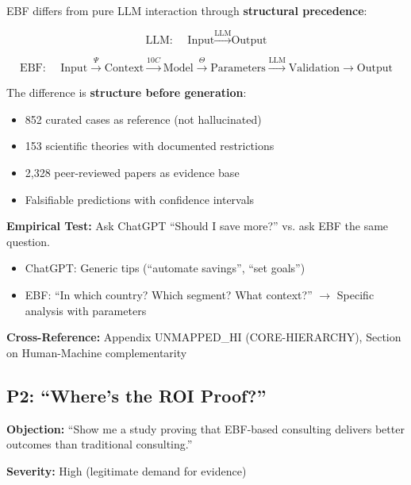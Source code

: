 \begin{axiom}
EBF differs from pure LLM interaction through \textbf{structural precedence}:

\begin{equation}
\text{LLM: } \quad \text{Input} \xrightarrow{\text{LLM}} \text{Output}
\end{equation}

\begin{equation}
\text{EBF: } \quad \text{Input} \xrightarrow{\Psi} \text{Context} \xrightarrow{10C} \text{Model} \xrightarrow{\Theta} \text{Parameters} \xrightarrow{\text{LLM}} \text{Validation} \rightarrow \text{Output}
\end{equation}

The difference is \textbf{structure before generation}:
\begin{itemize}[nosep]
    \item 852 curated cases as reference (not hallucinated)
    \item 153 scientific theories with documented restrictions
    \item 2,328 peer-reviewed papers as evidence base
    \item Falsifiable predictions with confidence intervals
\end{itemize}
\end{axiom}

\textbf{Empirical Test:} Ask ChatGPT ``Should I save more?'' vs. ask EBF the same question.
\begin{itemize}[nosep]
    \item ChatGPT: Generic tips (``automate savings'', ``set goals'')
    \item EBF: ``In which country? Which segment? What context?'' $\rightarrow$ Specific analysis with parameters
\end{itemize}

\textbf{Cross-Reference:} Appendix UNMAPPED_HI (CORE-HIERARCHY), Section on Human-Machine complementarity

\subsection{P2: ``Where's the ROI Proof?''}
\label{sec:da-p2}

\begin{tcolorbox}[colback=gray!5!white, colframe=gray!75!black]
\textbf{Objection:} ``Show me a study proving that EBF-based consulting
delivers better outcomes than traditional consulting.''

\textbf{Severity:} High (legitimate demand for evidence)
\end{tcolorbox}

